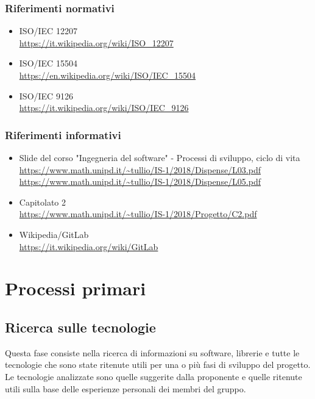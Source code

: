 \documentclass[11pt,a4paper]{article}
\begin{document}
	\subsubsection{Riferimenti normativi}
	\begin{itemize}
		\item ISO/IEC 12207 \\
		\url {https://it.wikipedia.org/wiki/ISO\_12207}
		\item ISO/IEC 15504 \\
		\url {https://en.wikipedia.org/wiki/ISO/IEC\_15504}
		\item ISO/IEC 9126 \\
		\url {https://it.wikipedia.org/wiki/ISO/IEC\_9126}
	\end{itemize}	
	
	\subsubsection{Riferimenti informativi}
	\begin{itemize}
		\item Slide del corso "Ingegneria del software" - Processi di sviluppo, ciclo di vita \\
		\url {https://www.math.unipd.it/~tullio/IS-1/2018/Dispense/L03.pdf} \\
		\url {https://www.math.unipd.it/~tullio/IS-1/2018/Dispense/L05.pdf}
		\item Capitolato 2 \\
		\url {https://www.math.unipd.it/~tullio/IS-1/2018/Progetto/C2.pdf}
		\item Wikipedia/GitLab \\
		\url {https://it.wikipedia.org/wiki/GitLab}
	\end{itemize}					
	\newpage
	
	\section{Processi primari}
	\subsection{Ricerca sulle tecnologie} 
	Questa fase consiste nella ricerca di informazioni su software, librerie e tutte le tecnologie che sono state ritenute utili per una o più fasi di sviluppo del progetto. Le tecnologie analizzate  sono quelle suggerite dalla proponente e quelle ritenute utili sulla base delle esperienze personali dei membri del gruppo. 
	
\end{document}
